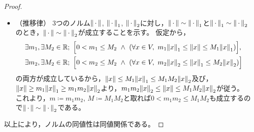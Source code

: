 \documentclass[b5paper,oneside,openany]{ltjsbook} %
\begin{document}
\begin{prop}
\begin{proof}
\begin{itemize}
            \item （推移律）
            3つのノルム$\norm{\dummy}$, $\norm{\dummy}_1$, $\norm{\dummy}_2$に対し，$\norm{\dummy}\sim \norm{\dummy}_1$と$\norm{\dummy}_1\sim \norm{\dummy}_2$のとき，$\norm{\dummy}\sim \norm{\dummy}_2$が成立することを示す。
            仮定から，
            \begin{align}
                &\exists m_1, \exists M_2\in\R;\ \bsqu{0<m_1\leq M_2\ \land \ \pare{
                \forall x\in V,\ m_1\norm{x}_1 \leq \norm{x} \leq M_1\norm{x}_1
                }},
                \\
                &\exists m_2, \exists M_2\in\R;\ \bsqu{0<m_2\leq M_2\ \land \ \pare{
                \forall x\in V,\ m_2\norm{x}_2 \leq \norm{x}_1 \leq M_2\norm{x}_2
                }}
            \end{align}
            の両方が成立しているから，$\norm{x}\leq M_1\norm{x}_1\leq M_1M_2\norm{x}_2$及び，$\norm{x}\geq m_1\norm{x}_1\geq m_1m_2 \norm{x}_2$より，$m_1m_2\norm{x}_2\leq \norm{x}\leq M_1M_2\norm{x}_2$が従う。
            これより，$m\coloneqq m_1m_2$, $M\coloneqq M_1M_2$と取れば$0<m_1m_2\leq M_1M_2$も成立するので$\norm{\dummy}\sim \norm{\dummy}_2$である。
        \end{itemize}

        以上により，ノルムの同値性は同値関係である。
    \end{proof}
\end{prop}
\end{document}
